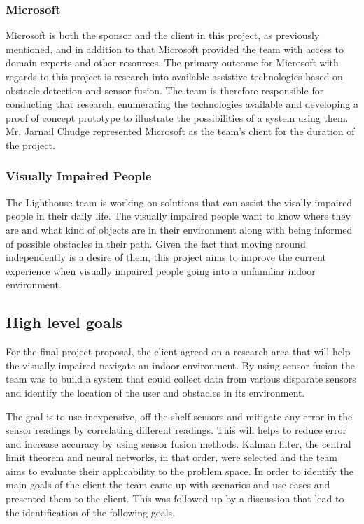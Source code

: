 \documentclass[prodmode,acmtosem]{acmsmall} %
\begin{document}
\subsubsection{Microsoft}
Microsoft is both the sponsor and the client in this project, as previously mentioned, and in addition to that Microsoft provided the team with access to domain experts and other resources. The primary outcome for Microsoft with regards to this project is research into available assistive technologies based on obstacle detection and sensor fusion. The team is therefore responsible for conducting that research, enumerating the technologies available and developing a proof of concept prototype to illustrate the possibilities of a system using them.
Mr. Jarnail Chudge represented Microsoft as the team's client for the duration of the project.

\subsubsection{Visually Impaired People}
The Lighthouse team is working on solutions that can assist the visally impaired people in their daily life. The visually impaired people want to know where they are and what kind of objects are in their environment along with being informed of possible obstacles in their path. Given the fact that moving around independently is a desire of them, this project aims to improve the current experience when visually impaired people going into a unfamiliar indoor environment.

\subsection{High level goals}
For the final project proposal, the client agreed on a research area that will help the visually impaired navigate an indoor environment.
By using sensor fusion the team was to build a system that could collect data from various disparate sensors and identify the location of the user and obstacles in its environment.

The goal is to use inexpensive, off-the-shelf sensors and mitigate any error in the sensor readings by correlating different readings. This will helps to reduce error and increase accuracy by using sensor fusion methods. Kalman filter, the central limit theorem and neural networks, in that order, were selected and the team aims to evaluate their applicability to the problem space. In order to identify the main goals of the client the team came up with scenarios and use cases and presented them to the client. This was followed up by a discussion that lead to the identification of the following goals.
\end{document}
